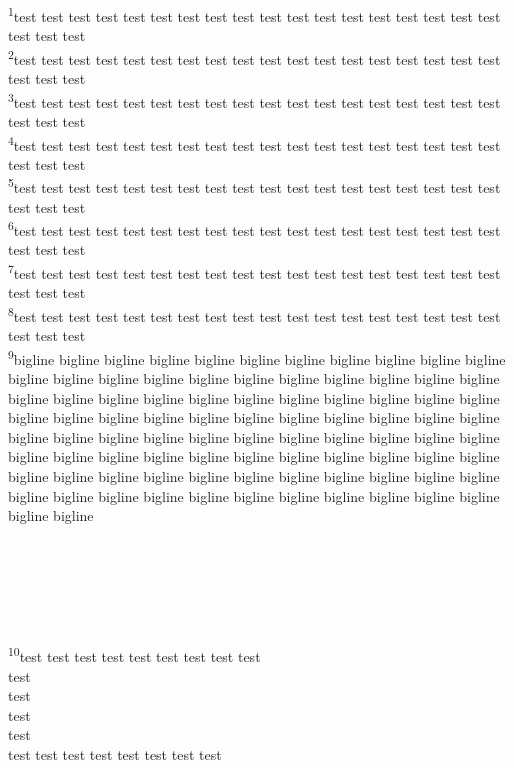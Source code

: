 \documentclass[10pt,twocolumn]{memoir}
\newcommand{\verseref}[2]{\textsuperscript{#2}}
\begin{document}
\noindent
\verseref{2}{1}test test test test test test test test test test test test test test test test test test test test test\\ 
\verseref{2}{2}test test test test test test test test test test test test test test test test test test test test test\\ 
\verseref{2}{3}test test test test test test test test test test test test test test test test test test test test test\\ 
\verseref{2}{4}test test test test test test test test test test test test test test test test test test test test test\\ 
\verseref{2}{5}test test test test test test test test test test test test test test test test test test test test test\\ 
\verseref{2}{6}test test test test test test test test test test test test test test test test test test test test test\\ 
\verseref{2}{7}test test test test test test test test test test test test test test test test test test test test test\\ 
\verseref{2}{8}test test test test test test test test test test test test test test test test test test test test test\\ 
\verseref{2}{9}bigline bigline bigline bigline bigline bigline bigline bigline bigline bigline bigline bigline bigline bigline bigline bigline bigline bigline bigline bigline bigline bigline bigline bigline bigline bigline bigline bigline bigline bigline bigline bigline bigline bigline bigline bigline bigline bigline bigline bigline bigline bigline bigline bigline bigline bigline bigline bigline bigline bigline bigline bigline bigline bigline bigline bigline bigline bigline bigline bigline bigline bigline bigline bigline bigline bigline bigline bigline bigline bigline bigline bigline bigline bigline bigline bigline bigline bigline bigline bigline bigline bigline bigline bigline bigline bigline bigline bigline bigline bigline \\
\\
\\
\\
\\
\\
\\
\verseref{2}{10}test test test test test test test test test\\ test\\ test\\ test\\ test\\ test test test test test test test test\\ 
\end{document}
